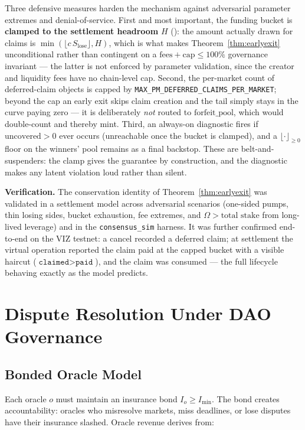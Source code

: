 \documentclass{ledger}
\theoremstyle{plain}
\theoremstyle{remark}
\begin{document}
Three defensive measures harden the mechanism against adversarial parameter
extremes and denial-of-service. First and most important, the funding bucket is
\textbf{clamped to the settlement headroom} $H$ (): the amount
actually drawn for claims is $\min(\lfloor c\,S_{\text{lose}}\rfloor, H)$, which is
what makes Theorem~\ref{thm:earlyexit} unconditional rather than contingent on a
$\text{fees} + \text{cap} \le 100\%$ governance invariant --- the latter is not
enforced by parameter validation, since the creator and liquidity fees have no
chain-level cap. Second, the per-market count of deferred-claim objects is capped
by \texttt{MAX\_PM\_DEFERRED\_CLAIMS\_PER\_MARKET}; beyond the cap an early exit
skips claim creation and the tail simply stays in the curve paying zero --- it is
deliberately \emph{not} routed to $\text{forfeit\_pool}$, which would double-count
and thereby mint. Third, an always-on diagnostic fires if $\text{uncovered} > 0$
ever occurs (unreachable once the bucket is clamped), and a $\lfloor \cdot
\rfloor_{\ge 0}$ floor on the winners' pool remains as a final backstop. These
are belt-and-suspenders: the clamp gives the guarantee by construction, and the
diagnostic makes any latent violation loud rather than silent.

\textbf{Verification.} The conservation identity of Theorem~\ref{thm:earlyexit}
was validated in a settlement model across adversarial scenarios (one-sided
pumps, thin losing sides, bucket exhaustion, fee extremes, and
$\Omega > \text{total stake}$ from long-lived leverage) and in the
\texttt{consensus\_sim} harness. It was further confirmed end-to-end on the VIZ
testnet: a cancel recorded a deferred claim; at settlement the virtual operation
reported the claim paid at the capped bucket with a visible haircut
($\texttt{claimed} > \texttt{paid}$), and the claim was consumed --- the full
lifecycle behaving exactly as the model predicts.

\section{Dispute Resolution Under DAO Governance}\label{sec:dispute}

\subsection{Bonded Oracle Model}

Each oracle $o$ must maintain an insurance bond $I_o \geq I_{\min}$. The bond
creates accountability: oracles who misresolve markets, miss deadlines, or lose
disputes have their insurance slashed. Oracle revenue derives from:
\end{document}

